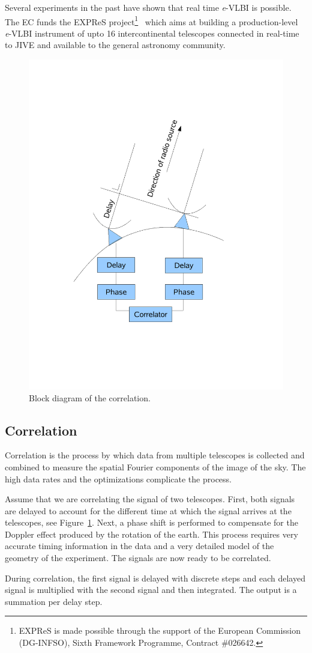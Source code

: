 \documentclass[12pt]{article}
\begin{document}
Several experiments in the past have shown that real time {\it e}-VLBI
is possible. The EC funds the EXPReS project\footnote{EXPReS is made
  possible through the support of the European Commission (DG-INFSO),
  Sixth Framework Programme, Contract \#026642.}~\cite{EXPReS} which
aims at building a production-level {\it e}-VLBI instrument of upto 16
intercontinental telescopes connected in real-time to JIVE and
available to the general astronomy community.

\begin{figure}
  \centering
  \includegraphics[width=.425\textwidth]
    {img/VLBI}
    \caption{Block diagram of the correlation.}
  \label{fig:correlation_diagram}
\end{figure}
\subsection{Correlation}
Correlation is the process by which data from multiple telescopes is
collected and combined to measure the spatial Fourier components of
the image of the sky. The high data rates and the optimizations
complicate the process.

Assume that we are correlating the signal of two telescopes. First,
both signals are delayed to account for the different time at which
the signal arrives at the telescopes, see
Figure~\ref{fig:correlation_diagram}. Next, a phase shift is performed
to compensate for the Doppler effect produced by the rotation of the
earth. This process requires very accurate timing information in the
data and a very detailed model of the geometry of the experiment. The
signals are now ready to be correlated.

During correlation, the first signal is delayed with discrete steps
and each delayed signal is multiplied with the second signal and then
integrated.  The output is a summation per delay step.
\end{document}
